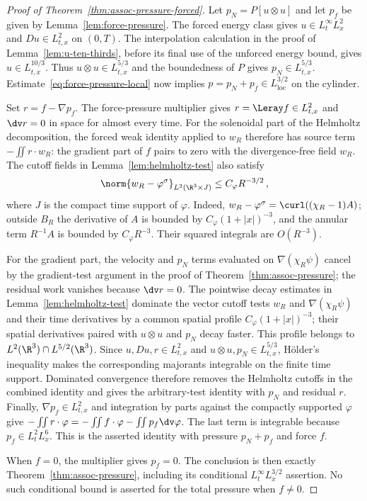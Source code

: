 \documentclass[11pt,reqno]{amsart}
\begin{document}
\begin{proof}[Proof of Theorem~\ref{thm:assoc-pressure-forced}]
Let $p_N=P[u\otimes u]$ and let $p_f$ be given by
Lemma~\ref{lem:force-pressure}. The forced energy class gives
$u\in L^\infty_tL^2_x$ and $Du\in L^2_{t,x}$ on $(0,T)$. The interpolation
calculation in the proof of Lemma~\ref{lem:u-ten-thirds}, before its final
use of the unforced energy bound, gives $u\in L^{10/3}_{t,x}$. Thus
$u\otimes u\in L^{5/3}_{t,x}$ and the boundedness of $P$ gives
$p_N\in L^{5/3}_{t,x}$. Estimate~\eqref{eq:force-pressure-local} now implies
$p=p_N+p_f\in L^{3/2}_{\mathrm{loc}}$ on the cylinder.

Set $r=f-\nabla p_f$. The force-pressure multiplier gives $r=\Leray f\in L^2_{t,x}$ and $\dv r=0$ in space for almost every time. For the solenoidal part of the Helmholtz decomposition, the forced weak identity applied to $w_R$ therefore has source term $-\iint r\cdot w_R$: the gradient part of $f$ pairs to zero with the divergence-free field $w_R$. The cutoff fields in Lemma~\ref{lem:helmholtz-test} also satisfy
\begin{equation}\label{eq:forced-helmholtz-L2}
 \norm{w_R-\varphi^\sigma}_{L^2(\R^3\times J)}\le C_\varphi R^{-3/2}\,,
\end{equation}
where $J$ is the compact time support of $\varphi$. Indeed, $w_R-\varphi^\sigma=\curl((\chi_R-1)A)$; outside $B_R$ the derivative of $A$ is bounded by $C_\varphi(1+|x|)^{-3}$, and the annular term $R^{-1}A$ is bounded by $C_\varphi R^{-3}$. Their squared integrals are $O(R^{-3})$.

For the gradient part, the velocity and $p_N$ terms evaluated on $\nabla(\chi_R\psi)$ cancel by the gradient-test argument in the proof of Theorem~\ref{thm:assoc-pressure}; the residual work vanishes because $\dv r=0$. The pointwise decay estimates in Lemma~\ref{lem:helmholtz-test} dominate the vector cutoff tests $w_R$ and $\nabla(\chi_R\psi)$ and their time derivatives by a common spatial profile $C_\varphi(1+|x|)^{-3}$; their spatial derivatives paired with $u\otimes u$ and $p_N$ decay faster. This profile belongs to $L^2(\R^3)\cap L^{5/2}(\R^3)$. Since $u,Du,r\in L^2_{t,x}$ and $u\otimes u,p_N\in L^{5/3}_{t,x}$, H\"older's inequality makes the corresponding majorants integrable on the finite time support. Dominated convergence therefore removes the Helmholtz cutoffs in the combined identity and gives the arbitrary-test identity with $p_N$ and residual $r$. Finally, $\nabla p_f\in L^2_{t,x}$ and integration by parts against the compactly supported $\varphi$ give $-\iint r\cdot\varphi=-\iint f\cdot\varphi-\iint p_f\dv\varphi$. The last term is integrable because $p_f\in L^2_tL^6_x$. This is the asserted identity with pressure $p_N+p_f$ and force $f$.

When $f=0$, the multiplier gives $p_f=0$. The conclusion is then exactly
Theorem~\ref{thm:assoc-pressure}, including its conditional
$L^\infty_tL^{3/2}_x$ assertion. No such conditional bound is asserted for
the total pressure when $f\ne0$.
\end{proof}
\end{document}
